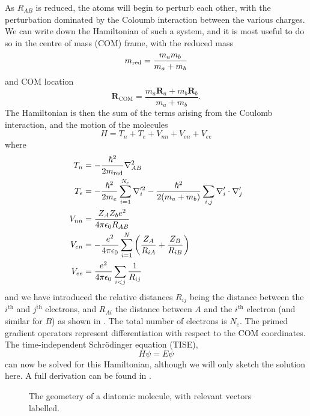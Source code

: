 As $R_{AB}$ is reduced, the atoms will begin to perturb each other, with the
perturbation dominated by the Coloumb interaction between the various charges.
We can write down the Hamiltonian of such a system, and it is most useful to do
so in the centre of mass (COM) frame, with the reduced mass
%
\begin{equation}
  m_\text{red}{} = \frac{m_a m_b}{m_a + m_b}
\end{equation}
%
and COM location
%
\begin{equation}
  \mathbf{R}_\text{COM} = \frac{m_a \mathbf{R}_a + m_b \mathbf{R}_b}{m_a+m_b}.
\end{equation}
%
The Hamiltonian is then the sum of the terms arising from the Coulomb
interaction, and the motion of the molecules
%
\begin{equation}
  H = T_n + T_e + V_{nn} + V_{en} + V_{ee}
\end{equation}
%
where
%
\begin{align}
  T_n &= -\frac{\hbar^2}{2m_\text{red}{}}\nabla_{AB}^2\\
  T_e &= -\frac{\hbar^2}{2 m_e}\sum_{i=1}^{N_e} \nabla_i'^2 -
  \frac{\hbar^2}{2(m_a + m_b)}\sum_{i, j} \nabla'_i \cdot \nabla'_j \\
  V_{nn} &= \frac{Z_A Z_b e^2}{4\pi\epsilon_0 R_{AB}} \\
  V_{en} &= - \frac{e^2}{4\pi\epsilon_0}\sum_{i=1}^N \left(\frac{Z_A}{R_{iA}} + \frac{Z_B}{R_{iB}}\right) \\
  V_{ee} &= \frac{e^2}{4\pi\epsilon_0}\sum_{i<j} \frac{1}{R_{ij}}
\end{align}
%
and we have introduced the relative distances $R_{ij}$ being the distance
between the $i^\text{th}$ and $j^\text{th}$ electrons, and $R_{Ai}$ the
distance between $A$ and the $i^\text{th}$ electron (and similar for $B$) as
shown in . The total number of electrons is
$N_e$. The primed gradient operators represent differentiation with respect to
the COM coordinates.
%
The time-independent Schr\"odinger equation (TISE),
%
\begin{equation}
  H\psi = E\psi
\end{equation}
%
can now be solved for this Hamiltonian, although we will only sketch the
solution here. A full derivation can be found in \inlineref{}.

\begin{figure}
  \centering
  \caption{
    The geometery of a diatomic molecule, with relevant vectors labelled.
  }
  \label{theory:fig:mol}
\end{figure}



